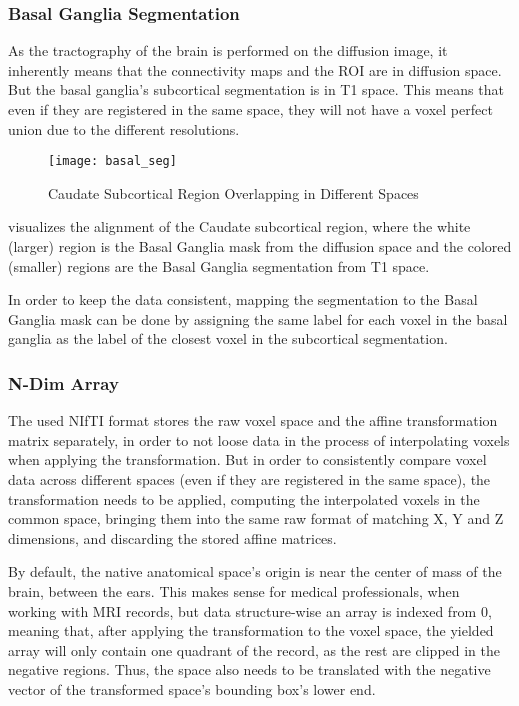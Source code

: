 \subsubsection{Basal Ganglia Segmentation}

As the tractography of the brain is performed on the diffusion image, it inherently means that the connectivity maps and the \ac{ROI} are in diffusion space. But the basal ganglia's subcortical segmentation is in T1 space. This means that even if they are registered in the same space, they will not have a voxel perfect union due to the different resolutions.

\begin{figure}[H]
\centering
\texttt{[image: basal\_seg]}
\caption{Caudate Subcortical Region Overlapping in Different Spaces}
\label{fig:basal_seg}
\end{figure}

 visualizes the alignment of the Caudate subcortical region, where the white (larger) region is the Basal Ganglia mask from the diffusion space and the colored (smaller) regions are the Basal Ganglia segmentation from T1 space.\par

In order to keep the data consistent, mapping the segmentation to the Basal Ganglia mask can be done by assigning the same label for each voxel in the basal ganglia as the label of the closest voxel in the subcortical segmentation.

\subsubsection{N-Dim Array}
The used \ac{NIfTI} format stores the raw voxel space and the affine transformation matrix separately, in order to not loose data in the process of interpolating voxels when applying the transformation. But in order to consistently compare voxel data across different spaces (even if they are registered in the same space), the transformation needs to be applied, computing the interpolated voxels in the common space, bringing them into the same raw format of matching X, Y and Z dimensions, and discarding the stored affine matrices.\par

By default, the native anatomical space's origin is near the center of mass of the brain, between the ears. This makes sense for medical professionals, when working with \ac{MRI} records, but data structure-wise an array is indexed from 0, meaning that, after applying the transformation to the voxel space, the yielded array will only contain one quadrant of the record, as the rest are clipped in the negative regions. Thus, the space also needs to be translated with the negative vector of the transformed space's bounding box's lower end.\par

